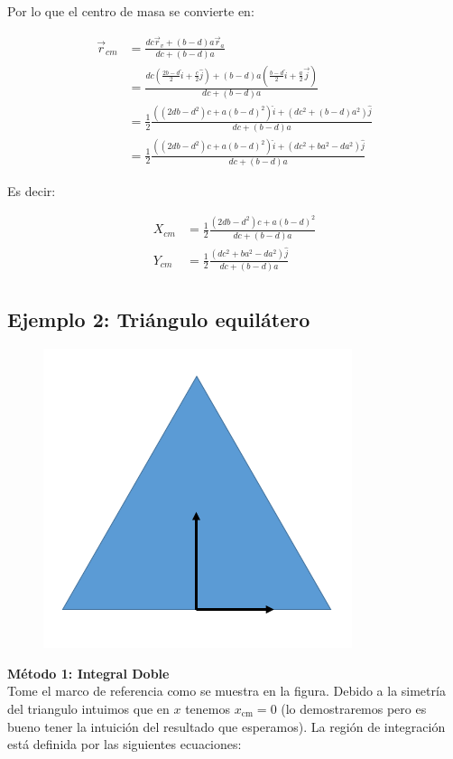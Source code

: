 \documentclass[a4paper,11pt]{article}
\begin{document}
Por lo que el centro de masa se convierte en:

\begin{align*}
\vec{r}_{cm}  &= \frac{  dc \vec{r}_v+  (b-d)a \vec{r}_a}{ dc + (b-d)a}\\
&= \frac{  dc ( \frac{2b-d}{2}\hat{i} + \frac{c}{2}\hat{j})+  (b-d)a (\frac{b-d}{2} \hat{i} + \frac{a}{2} \vec{j})}{ dc + (b-d)a}\\
& =\frac{1}{2} \frac{  ((2db-d^2)c +a(b-d)^2) \hat{i} + (dc^2+(b-d)a^2)\hat{j}}{ dc + (b-d)a}\\
& = \frac{1}{2} \frac{   ((2db-d^2)c +a(b-d)^2) \hat{i} + (dc^2+ba^2-da^2)\hat{j}}{ dc + (b-d)a}
\end{align*}

Es decir:


\begin{align*}
X_{cm}  &= \frac{1}{2} \frac{   (2db-d^2)c +a(b-d)^2 }{ dc + (b-d)a}\\
Y_{cm}&= \frac{1}{2} \frac{   (dc^2+ba^2-da^2)\hat{j}}{ dc + (b-d)a}\\
\end{align*}


\subsection{Ejemplo 2: Triángulo equilátero}



\begin{figure}
	\includegraphics[scale=0.5]{./im/tri}
\end{figure}
\textbf{Método 1: Integral Doble }\\

Tome el marco de referencia como se muestra en la figura. Debido a la simetría del triangulo intuimos que en $x$ tenemos $x_{\text{cm}} = 0$ (lo demostraremos pero es bueno tener la intuición del resultado que esperamos). La región de integración está definida por las siguientes ecuaciones:
\end{document}

